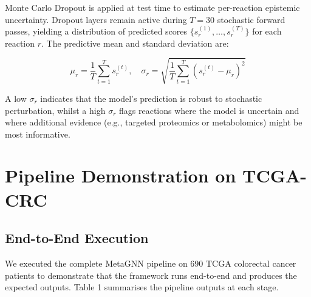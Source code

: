 \documentclass[12pt,a4paper]{article}
\begin{document}
Monte Carlo Dropout is applied at test time to estimate per-reaction epistemic uncertainty. Dropout layers remain active during $T = 30$ stochastic forward passes, yielding a distribution of predicted scores $\{s_r^{(1)}, \ldots, s_r^{(T)}\}$ for each reaction $r$. The predictive mean and standard deviation are:

\begin{equation}
\mu_r = \frac{1}{T} \sum_{t=1}^{T} s_r^{(t)}, \quad \sigma_r = \sqrt{\frac{1}{T} \sum_{t=1}^{T} (s_r^{(t)} - \mu_r)^2}
\end{equation}

A low $\sigma_r$ indicates that the model's prediction is robust to stochastic perturbation, whilst a high $\sigma_r$ flags reactions where the model is uncertain and where additional evidence (e.g., targeted proteomics or metabolomics) might be most informative.

\section{Pipeline Demonstration on TCGA-CRC}

\subsection{End-to-End Execution}

We executed the complete MetaGNN pipeline on 690 TCGA colorectal cancer patients to demonstrate that the framework runs end-to-end and produces the expected outputs. Table 1 summarises the pipeline outputs at each stage.
\end{document}
